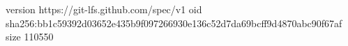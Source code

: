 version https://git-lfs.github.com/spec/v1
oid sha256:bb1c59392d03652e435b9f097266930e136c52d7da69bcff9d4870abc90f67af
size 110550
